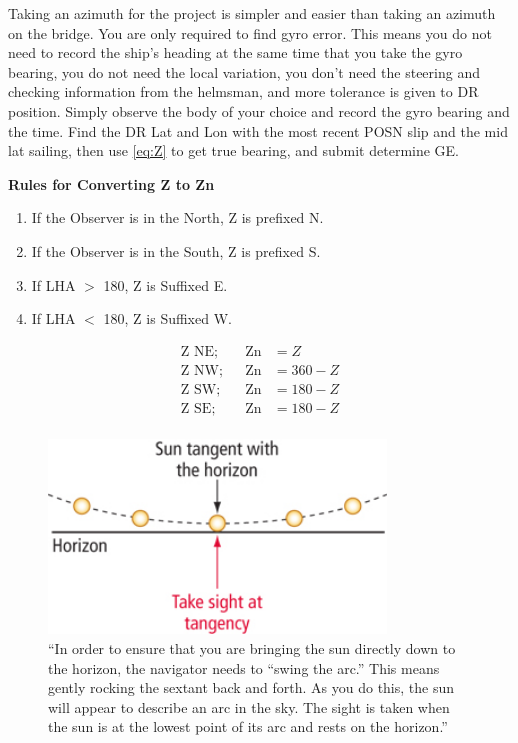 \documentclass[letterpaper,12pt]{article}
\begin{document}
Taking an azimuth for the project is simpler and easier than taking an azimuth on the bridge.
You are only required to find gyro error.
This means you do not need to record the ship's heading at the same time that you take the gyro bearing, you do not need the local variation, you don't need the steering and checking information from the helmsman, and more tolerance is given to DR position.
Simply observe the body of your choice and record the gyro bearing and the time.
Find the DR Lat and Lon with the most recent POSN slip and the mid lat sailing, then use \ref{eq:Z} to get true bearing, and submit determine GE.

\begin{mdframed}
	\centering
\textbf{Rules for Converting Z to Zn}
\flushleft
\begin{minipage}{0.5\textwidth}
\begin{enumerate}
	\item If the Observer is in the North, Z is prefixed N.
	\item If the Observer is in the South, Z is prefixed S.
	\item If LHA $>$ 180, Z is Suffixed E.
	\item If LHA $<$ 180, Z is Suffixed W.
\end{enumerate}
\end{minipage}
\hspace{.05\textwidth}
\begin{minipage}{0.4\textwidth}
\begin{align*}
	\text{Z NE};&		&\text{Zn}&=Z\\
	\text{Z NW};&		&\text{Zn}&=360-Z\\
	\text{Z SW};&		&\text{Zn}&=180-Z\\
	\text{Z SE};&		&\text{Zn}&=180-Z\\
\end{align*}
\end{minipage}
\end{mdframed}
\newpage
\begin{figure}[htpb]
	\centering
	\includegraphics[width=0.8\textwidth]{static/nav1.jpg}
	\caption{``In order to ensure that you are bringing the sun directly down to the horizon, the navigator needs to “swing the arc.” This means gently rocking the sextant back and forth. As you do this, the sun will appear to describe an arc in the sky. The sight is taken when the sun is at the lowest point of its arc and rests on the horizon.''}
	\label{fig:swingarc}
\end{figure}
\end{document}
